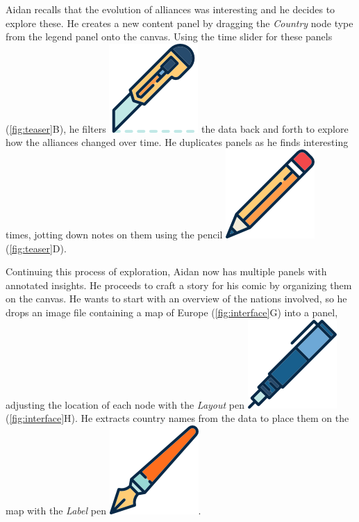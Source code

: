Aidan recalls that the evolution of alliances was interesting and he decides to explore these. He creates a new content panel by dragging the {\it Country} node type from the legend panel onto the canvas. Using the time slider for these panels (\autoref{fig:teaser}B), he filters \includegraphics[scale=0.02]{figures/filter_pen.png} the data back and forth to explore how the alliances changed over time. He duplicates panels as he finds interesting times, jotting down notes on them using the pencil \includegraphics[scale=0.02]{figures/draw_pen.png} (\autoref{fig:teaser}D).


Continuing this process of exploration, Aidan now has multiple panels with annotated insights. He proceeds to craft a story for his comic by organizing them on the canvas. He wants to start with an overview of the nations involved, so he drops an image file containing a map of Europe (\autoref{fig:interface}G) into a panel, adjusting the location of each node with the \textit{Layout} pen \includegraphics[scale=0.02]{figures/layout_pen.png} (\autoref{fig:interface}H). He extracts country names from the data to place them on the map with the \textit{Label} pen \includegraphics[scale=0.02]{figures/label_pen.png}. 


